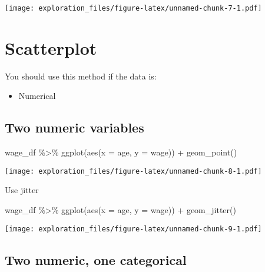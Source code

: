 \documentclass[
]{book}
\newenvironment{Shaded}{\begin{snugshade}}{\end{snugshade}}
\newcommand{\AttributeTok}[1]{\textcolor[rgb]{0.77,0.63,0.00}{#1}}
\newcommand{\FunctionTok}[1]{\textcolor[rgb]{0.00,0.00,0.00}{#1}}
\newcommand{\NormalTok}[1]{#1}
\newcommand{\SpecialCharTok}[1]{\textcolor[rgb]{0.00,0.00,0.00}{#1}}
\providecommand{\tightlist}{%
  \setlength{\itemsep}{0pt}\setlength{\parskip}{0pt}}
\begin{document}
\texttt{[image: exploration\_files/figure-latex/unnamed-chunk-7-1.pdf]}

\hypertarget{scatterplot}{%
\chapter{Scatterplot}\label{scatterplot}}

You should use this method if the data is:

\begin{itemize}
\tightlist
\item
  Numerical
\end{itemize}

\hypertarget{two-numeric-variables}{%
\section{Two numeric variables}\label{two-numeric-variables}}

\begin{Shaded}
\begin{Highlighting}[]
\NormalTok{wage\_df }\SpecialCharTok{\%\textgreater{}\%} 
  \FunctionTok{ggplot}\NormalTok{(}\FunctionTok{aes}\NormalTok{(}\AttributeTok{x =}\NormalTok{ age, }\AttributeTok{y =}\NormalTok{ wage)) }\SpecialCharTok{+}
  \FunctionTok{geom\_point}\NormalTok{()}
\end{Highlighting}
\end{Shaded}

\texttt{[image: exploration\_files/figure-latex/unnamed-chunk-8-1.pdf]}

Use jitter

\begin{Shaded}
\begin{Highlighting}[]
\NormalTok{wage\_df }\SpecialCharTok{\%\textgreater{}\%} 
  \FunctionTok{ggplot}\NormalTok{(}\FunctionTok{aes}\NormalTok{(}\AttributeTok{x =}\NormalTok{ age, }\AttributeTok{y =}\NormalTok{ wage)) }\SpecialCharTok{+}
  \FunctionTok{geom\_jitter}\NormalTok{()}
\end{Highlighting}
\end{Shaded}

\texttt{[image: exploration\_files/figure-latex/unnamed-chunk-9-1.pdf]}

\hypertarget{two-numeric-one-categorical}{%
\section{Two numeric, one categorical}\label{two-numeric-one-categorical}}
\end{document}
